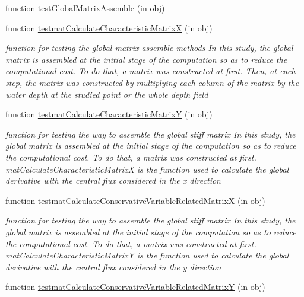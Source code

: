 \begin{DoxyCompactItemize}
function \hyperlink{class_ndg_nonhydrostatic_abstract_test_a7cadf01d4f6f9498a107b545c2baca9f}{test\+Global\+Matrix\+Assemble} (in obj)
\item 
function \hyperlink{class_ndg_nonhydrostatic_abstract_test_ae4f798477c8a77c893a907d20fb6817d}{testmat\+Calculate\+Characteristic\+MatrixX} (in obj)
\begin{DoxyCompactList}\small\item\em function for testing the global matrix assemble methods In this study, the global matrix is assembled at the initial stage of the computation so as to reduce the computational cost. To do that, a matrix was constructed at first. Then, at each step, the matrix was constructed by multiplying each column of the matrix by the water depth at the studied point or the whole depth field \end{DoxyCompactList}\item 
function \hyperlink{class_ndg_nonhydrostatic_abstract_test_a1af91113ed159212582b07992ffc3b0a}{testmat\+Calculate\+Characteristic\+MatrixY} (in obj)
\begin{DoxyCompactList}\small\item\em function for testing the way to assemble the global stiff matrix In this study, the global matrix is assembled at the initial stage of the computation so as to reduce the computational cost. To do that, a matrix was constructed at first. mat\+Calculate\+Characteristic\+MatrixX is the function used to calculate the global derivative with the central flux considered in the x direction \end{DoxyCompactList}\item 
function \hyperlink{class_ndg_nonhydrostatic_abstract_test_ae641189c4f37199dd5b50a72a116f20a}{testmat\+Calculate\+Conservative\+Variable\+Related\+MatrixX} (in obj)
\begin{DoxyCompactList}\small\item\em function for testing the way to assemble the global stiff matrix In this study, the global matrix is assembled at the initial stage of the computation so as to reduce the computational cost. To do that, a matrix was constructed at first. mat\+Calculate\+Characteristic\+MatrixY is the function used to calculate the global derivative with the central flux considered in the y direction \end{DoxyCompactList}\item 
function \hyperlink{class_ndg_nonhydrostatic_abstract_test_a12407c5a97033d5ddf54fccabf4a9b09}{testmat\+Calculate\+Conservative\+Variable\+Related\+MatrixY} (in obj)

\end{DoxyCompactItemize}
